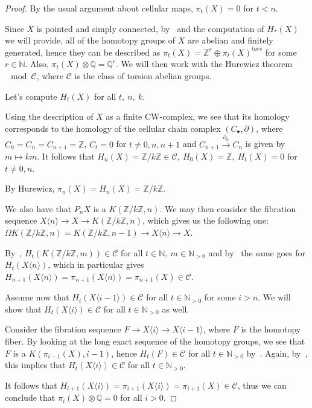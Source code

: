 \documentclass{article}
\newcommand{\numberset}{\mathbb}
\newcommand{\N}{\numberset{N}}
\newcommand{\Z}{\numberset{Z}}
\newcommand{\Q}{\numberset{Q}}
\begin{document}
\begin{proof}    
    By the usual argument about cellular maps, $\pi_t(X)=0$ for $t<n$.
    
    Since $X$ is pointed and simply connected, by~\cite[thm. 12.1]{HM19} and the
    computation of $H_*(X)$ we will provide,
    all of the homotopy groups of $X$ are abelian and finitely generated, hence
    they can be described as $\pi_t(X)=\Z^r\oplus\pi_t(X)^{tors}$ for some
    $r\in\N$. Also, $\pi_t(X)\otimes\Q=\Q^r$. We will then work with the
    Hurewicz theorem$\mod\mathcal{C}$, where $\mathcal{C}$ is the class of
    torsion abelian groups.
    
    Let's compute $H_t(X)$ for all $t,\ n,\ k$.

    Using the description of $X$ as a finite CW-complex, we see that its
    homology corresponds to the homology of the cellular chain complex
    $(C_\bullet,\partial)$, where $C_0=C_n=C_{n+1}=\Z$, $C_t=0$ for
    $t\neq 0,n,n+1$ and $C_{n+1}\xrightarrow{\partial_n}C_n$ is given by
    $m\mapsto km$. It follows that $H_n(X)=\Z/k\Z\in\mathcal{C},\ H_0(X)=\Z,\
    H_t(X)=0$ for $t\neq 0,n$.

    By Hurewicz, $\pi_n(X)=H_n(X)=\Z/k\Z$.

    We also have that $P_nX$ is a $K(\Z/k\Z,n)$. We may then consider the
    fibration sequence $X\langle n\rangle\rightarrow X\rightarrow K(\Z/k\Z,n)$,
    which gives us the following one: $\Omega
    K(\Z/k\Z,n)=K(\Z/k\Z,n-1)\rightarrow X\langle n\rangle\rightarrow X$.

    By~\cite[lemma 13.16]{HM19}, $H_t(K(\Z/k\Z,m))\in\mathcal{C}$ for all
    $t\in\N,\ m\in\N_{>0}$ and by~\cite[lemma 13.15]{HM19} the same goes for
    $H_t(X\langle n\rangle)$, which in particular gives
    $H_{n+1}(X\langle n\rangle)=\pi_{n+1}(X\langle
    n\rangle)=\pi_{n+1}(X)\in\mathcal{C}$.

    Assume now that $H_t(X\langle i-1\rangle)\in\mathcal{C}$ for all
    $t\in\N_{>0}$ for some $i>n$. We will show that $H_t(X\langle
    i\rangle)\in\mathcal{C}$ for all $t\in\N_{>0}$ as well.

    Consider the fibration sequence $F\rightarrow X\langle i\rangle\rightarrow
    X\langle i-1\rangle$, where $F$ is the homotopy fiber. By looking at the
    long exact sequence of the homotopy groups, we see that $F$ is a
    $K(\pi_{i-1}(X),i-1)$, hence $H_t(F)\in\mathcal{C}$ for all $t\in\N_{>0}$
    by~\cite[lemma 13.16]{HM19}. Again, by~\cite[lemma 13.15]{HM19}, this
    implies that $H_t(X\langle i\rangle)\in\mathcal{C}$ for all $t\in\N_{>0}$.
    
    It follows that $H_{i+1}(X\langle i\rangle)=\pi_{i+1}(X\langle
    i\rangle)=\pi_{i+1}(X)\in\mathcal{C}$, thus we can conclude that
    $\pi_i(X)\otimes\Q=0$ for all $i>0$.
\end{proof}

\printbibliography
\end{document}
